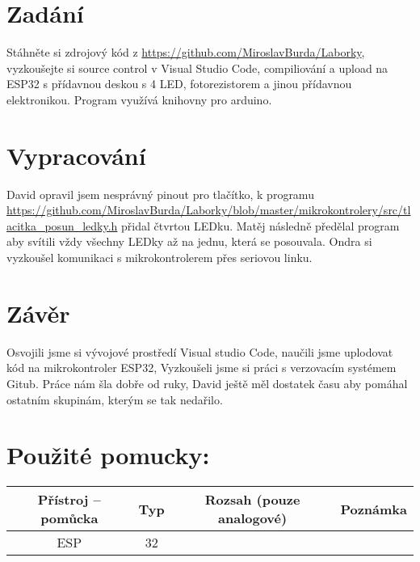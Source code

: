 \documentclass[12pt,a4paper]{article}
\begin{document}




\section*{Zadání}
Stáhněte si zdrojový kód z \url{https://github.com/MiroslavBurda/Laborky}, vyzkoušejte si source control v Visual Studio Code, compiliování a upload na ESP32 s přídavnou deskou s 4 LED, fotorezistorem a jinou přídavnou elektronikou. Program využívá knihovny pro arduino.

\section*{Vypracování}
David opravil jsem nesprávný pinout pro tlačítko, k programu \url{https://github.com/MiroslavBurda/Laborky/blob/master/mikrokontrolery/src/tlacitka_posun_ledky.h} přidal čtvrtou LEDku. Matěj následně předělal program aby svítili vždy všechny LEDky až na jednu, která se posouvala. Ondra si vyzkoušel komunikaci s mikrokontrolerem přes seriovou linku. 

\section*{Závěr}
Osvojili jsme si vývojové prostředí Visual studio Code, naučili jsme uplodovat kód na mikrokontroler ESP32, Vyzkoušeli jsme si práci s verzovacím systémem Gitub. Práce nám šla dobře od ruky, David ještě měl dostatek času aby pomáhal ostatním skupinám, kterým se tak nedařilo.
\vfill
\section*{Použité pomucky:}
\begin{tabularx}{\linewidth}{c|c|c|c}
	Přístroj – pomůcka & Typ & Rozsah (pouze analogové)
	& Poznámka \\
	\hline
	ESP & 32 & &
\end{tabularx}
\end{document}
